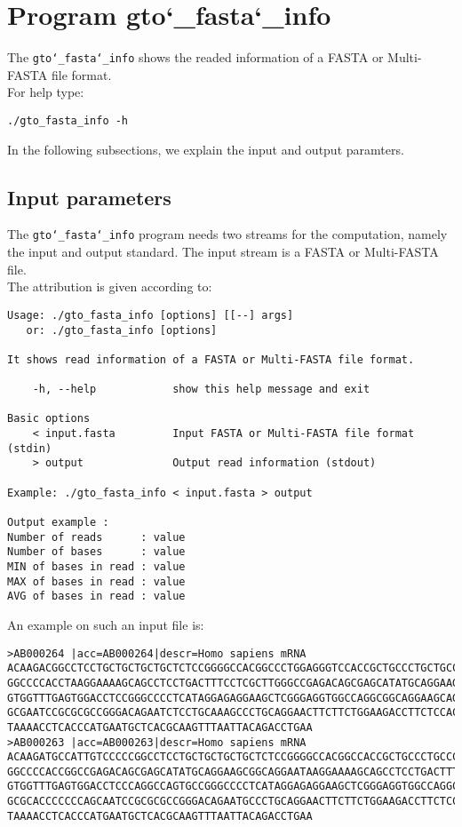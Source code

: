 \section{Program gto\char`_fasta\char`_info}
The \texttt{gto\char`_fasta\char`_info} shows the readed information of a FASTA or Multi-FASTA file format.\\
For help type:
\begin{lstlisting}
./gto_fasta_info -h
\end{lstlisting}
In the following subsections, we explain the input and output paramters.

\subsection*{Input parameters}

The \texttt{gto\char`_fasta\char`_info} program needs two streams for the computation, namely the input and output standard. The input stream is a FASTA or Multi-FASTA file.\\
The attribution is given according to:
\begin{lstlisting}
Usage: ./gto_fasta_info [options] [[--] args]
   or: ./gto_fasta_info [options]

It shows read information of a FASTA or Multi-FASTA file format.

    -h, --help            show this help message and exit

Basic options
    < input.fasta         Input FASTA or Multi-FASTA file format (stdin)
    > output              Output read information (stdout)

Example: ./gto_fasta_info < input.fasta > output

Output example :
Number of reads      : value
Number of bases      : value
MIN of bases in read : value
MAX of bases in read : value
AVG of bases in read : value
\end{lstlisting}
An example on such an input file is:
\begin{lstlisting}
>AB000264 |acc=AB000264|descr=Homo sapiens mRNA 
ACAAGACGGCCTCCTGCTGCTGCTGCTCTCCGGGGCCACGGCCCTGGAGGGTCCACCGCTGCCCTGCTGCCATTGTCCCC
GGCCCCACCTAAGGAAAAGCAGCCTCCTGACTTTCCTCGCTTGGGCCGAGACAGCGAGCATATGCAGGAAGCGGCAGGAA
GTGGTTTGAGTGGACCTCCGGGCCCCTCATAGGAGAGGAAGCTCGGGAGGTGGCCAGGCGGCAGGAAGCAGGCCAGTGCC
GCGAATCCGCGCGCCGGGACAGAATCTCCTGCAAAGCCCTGCAGGAACTTCTTCTGGAAGACCTTCTCCACCCCCCCAGC
TAAAACCTCACCCATGAATGCTCACGCAAGTTTAATTACAGACCTGAA
>AB000263 |acc=AB000263|descr=Homo sapiens mRNA 
ACAAGATGCCATTGTCCCCCGGCCTCCTGCTGCTGCTGCTCTCCGGGGCCACGGCCACCGCTGCCCTGCCCCTGGAGGGT
GGCCCCACCGGCCGAGACAGCGAGCATATGCAGGAAGCGGCAGGAATAAGGAAAAGCAGCCTCCTGACTTTCCTCGCTTG
GTGGTTTGAGTGGACCTCCCAGGCCAGTGCCGGGCCCCTCATAGGAGAGGAAGCTCGGGAGGTGGCCAGGCGGCAGGAAG
GCGCACCCCCCCAGCAATCCGCGCGCCGGGACAGAATGCCCTGCAGGAACTTCTTCTGGAAGACCTTCTCCTCCTGCAAA
TAAAACCTCACCCATGAATGCTCACGCAAGTTTAATTACAGACCTGAA
\end{lstlisting}

